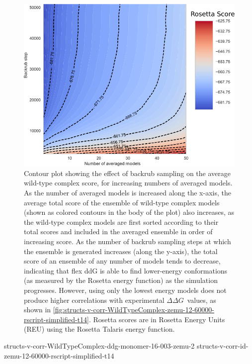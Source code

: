 \documentclass[journal=jpcbfk,manuscript=suppinfo]{achemso}
\newcommand\ddg{$\Delta\Delta G$}
\begin{document}
\begin{figure}
  \centering
  \includegraphics[width=\textwidth,keepaspectratio]{figures/wildtypecomplex-scores-complete.png}
  \caption{
    Contour plot showing the effect of backrub sampling on the average wild-type complex score, for increasing numbers of averaged models. As the number of averaged models is increased along the x-axis, the average total score of the ensemble of wild-type complex models (shown as colored contours in the body of the plot) also increases, as the wild-type complex models are first sorted according to their total scores and included in the averaged ensemble in order of increasing score.
    As the number of backrub sampling steps at which the ensemble is generated increases (along the y-axis), the total score of an ensemble of any number of models tends to decrease, indicating that flex ddG is able to find lower-energy conformations (as measured by the Rosetta energy function) as the simulation progresses. However, using only the lowest energy models does not produce higher correlations with experimental \ddg\ values, as shown in \cref{fig:structs-v-corr-WildTypeComplex-zemu-12-60000-rscript-simplified-t14}.
    Rosetta scores are in Rosetta Energy Units (REU) using the Rosetta Talaris energy function\cite{song_structure-guided_2011,shapovalov_smoothed_2011,omeara_combined_2015}.
  } \label{fig:wildtypecomplex-scores-complete}
\end{figure}

{structs-v-corr-WildTypeComplex-ddg-monomer-16-003-zemu-2}
{structs-v-corr-id-zemu-12-60000-rscript-simplified-t14}
\end{document}
